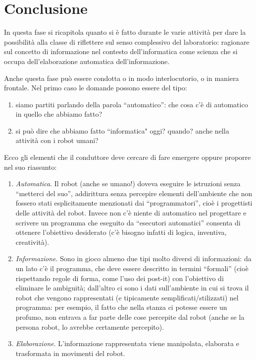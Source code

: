 \documentclass[12pt]{article}
\begin{document}
\section{Conclusione}

In questa fase si ricapitola quanto si è fatto durante le varie attività per dare la possibilità alla classe di riflettere sul senso complessivo del laboratorio: ragionare sul concetto di informazione nel contesto dell’informatica come scienza che si occupa dell’elaborazione automatica dell’informazione.

Anche questa fase può essere condotta o in modo interlocutorio, o in maniera frontale. Nel primo caso le domande possono essere del tipo:
\begin{enumerate}
\item siamo partiti parlando della parola ``automatico'': che cosa c’è di automatico in quello che abbiamo fatto?
\item si può dire che abbiamo fatto ``informatica" oggi? quando? anche nella attività con i robot umani?
\end{enumerate}

Ecco gli elementi che il conduttore deve cercare di fare emergere oppure proporre nel suo riassunto:
\begin{enumerate}
\item \textit{Automatica}. Il robot (anche se umano!) doveva eseguire le istruzioni senza ``metterci del suo'', addirittura senza percepire elementi dell’ambiente che non fossero stati esplicitamente menzionati dai ``programmatori'', cioè i progettisti delle attività del robot. Invece non c'è niente di automatico nel progettare e scrivere un programma che eseguito da ``esecutori automatici'' consenta di ottenere l’obiettivo desiderato (c'è bisogno infatti di logica, inventiva, creatività).
\item \textit{Informazione}. Sono in gioco almeno due tipi molto diversi di informazioni: da un lato c'è il programma, che deve essere descritto in termini ``formali'' (cioè rispettando regole di forma, come l’uso dei post-it) con l'obiettivo di eliminare le ambiguità; dall’altro ci sono i dati sull’ambiente in cui si trova il robot che vengono rappresentati (e tipicamente semplificati/stilizzati) nel programma: per esempio, il fatto che nella stanza ci potesse essere un profumo, non entrava a far parte delle cose percepite dal robot (anche se la persona robot, lo avrebbe certamente percepito).
\item \textit{Elaborazione}. L’informazione rappresentata viene manipolata, elaborata e trasformata in movimenti del robot.
\end{enumerate}
\end{document}
